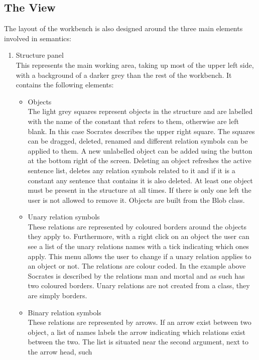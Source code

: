 \documentclass{report}
\begin{document}
\subsection{The View}
The layout of the workbench is also designed around the three main elements 
involved in semantics:

\begin{enumerate}
\item Structure panel \\
This represents the main working area, taking up most of the upper left side, 
with a background of a darker grey than the rest of the workbench. It contains 
the following elements:

\begin{itemize}
\item Objects \\
The light grey squares represent objects in the structure and are labelled with 
the name of the constant that refers to them, otherwise are left blank. In this 
case Socrates describes the upper right square. The squares can be dragged, 
deleted, renamed and different relation symbols can be applied to them. A new 
unlabelled object can be added using the button at the bottom right of the 
screen. Deleting an object refreshes the active sentence list, deletes any 
relation symbols related to it and if it is a constant any sentence that 
contains it is also deleted. At least one object must be present in the 
structure at all times. If there is only one left the user is not allowed to 
remove it. Objects are built from the Blob class.
\item Unary relation symbols \\
These relations are represented by coloured borders around the objects they 
apply to. Furthermore, with a right click on an object the user can see a list 
of the unary relations names with a tick indicating which ones apply. This menu 
allows the user to change if a unary relation applies to an object or not. The 
relations are colour coded. In the example above Socrates is described by the 
relations man and mortal and as such has two coloured borders. Unary relations 
are not created from a class, they are simply borders.
\item Binary relation symbols \\
These relations are represented by arrows. If an arrow exist between two object, 
a list of names labels the arrow indicating which relations exist between the 
two. The list is situated near the second argument, next to the arrow head, such 

\end{itemize}
\end{enumerate}
\end{document}
